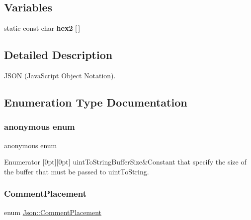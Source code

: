 \subsection*{Variables}
\begin{DoxyCompactItemize}
\item 
static const char {\bfseries hex2} \mbox{[}$\,$\mbox{]}
\end{DoxyCompactItemize}


\subsection{Detailed Description}
J\+S\+ON (Java\+Script Object Notation). 

\subsection{Enumeration Type Documentation}
\mbox{\label{namespaceJson_a2aacab54ef6fc18e833fbd4982a0a23a}} 
\subsubsection{\texorpdfstring{anonymous enum}{anonymous enum}}
{\footnotesize\ttfamily anonymous enum}

\begin{DoxyEnumFields}{Enumerator}
[0pt][0pt]{}\mbox{\label{namespaceJson_a2aacab54ef6fc18e833fbd4982a0a23aae4f2008c7919f20d81286121d1374424}} 
uint\+To\+String\+Buffer\+Size&Constant that specify the size of the buffer that must be passed to uint\+To\+String. \\
\hline

\end{DoxyEnumFields}
\mbox{\label{namespaceJson_a4fc417c23905b2ae9e2c47d197a45351}} 
\subsubsection{\texorpdfstring{Comment\+Placement}{CommentPlacement}}
{\footnotesize\ttfamily enum \hyperlink{namespaceJson_a4fc417c23905b2ae9e2c47d197a45351}{Json\+::\+Comment\+Placement}}

